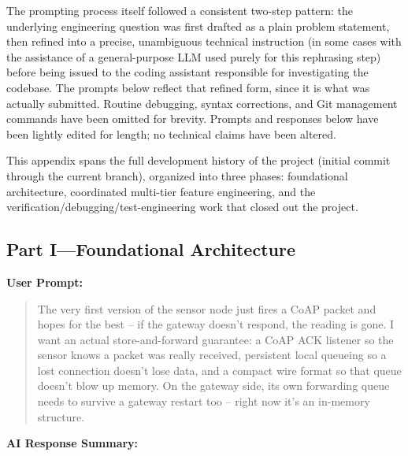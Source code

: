 \documentclass[conference]{IEEEtran}
\begin{document}
The prompting process itself followed a consistent two-step pattern: the underlying engineering question was first drafted as a plain problem statement, then refined into a precise, unambiguous technical instruction (in some cases with the assistance of a general-purpose LLM used purely for this rephrasing step) before being issued to the coding assistant responsible for investigating the codebase. The prompts below reflect that refined form, since it is what was actually submitted. Routine debugging, syntax corrections, and Git management commands have been omitted for brevity. Prompts and responses below have been lightly edited for length; no technical claims have been altered.

This appendix spans the full development history of the project (initial commit through the current branch), organized into three phases: foundational architecture, coordinated multi-tier feature engineering, and the verification/debugging/test-engineering work that closed out the project.

\subsection*{Part I---Foundational Architecture}

\par\vspace{4pt}\par\vspace{2pt}

\noindent\textbf{User Prompt:}\par

\begin{quote}
The very first version of the sensor node just fires a CoAP packet and hopes for the best -- if the gateway doesn't respond, the reading is gone. I want an actual store-and-forward guarantee: a CoAP ACK listener so the sensor knows a packet was really received, persistent local queueing so a lost connection doesn't lose data, and a compact wire format so that queue doesn't blow up memory. On the gateway side, its own forwarding queue needs to survive a gateway restart too -- right now it's an in-memory structure.
\end{quote}

\noindent\textbf{AI Response Summary:}\par
\end{document}
